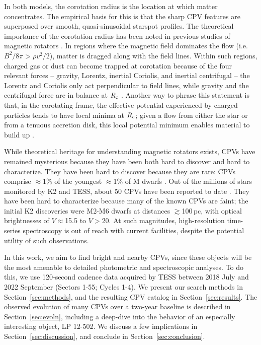 \documentclass[11pt,twocolumn,tighten]{aastex63}
\begin{document}
In both models, the corotation radius is the location at which matter
concentrates.  The empirical basis for this is that
the sharp CPV features are superposed over smooth, quasi-sinusoidal
starspot profiles.  The theoretical importance of the corotation
radius has been noted in previous studies of magnetic rotators
\citep[e.g.][]{1973ApJ...184..271L,1985Ap&SS.116..285N,1991ApJ...370L..39K,2005ApJ...634.1214L}.
%
%
In regions where the magnetic field dominates the flow (i.e.~$B^2/8\pi
> \rho v^2 /2$), matter is dragged along with the field lines.  
Within such regions, charged gas or dust can become trapped at corotation because
of the four relevant forces -- gravity, Lorentz, inertial
Coriolis, and inertial centrifugal -- the Lorentz and Coriolis only
act perpendicular to field lines, while gravity and the centrifugal
force are in balance at $R_{\rm c}$ \citep[e.g.][their
Section~2]{2005MNRAS.357..251T}.  Another way to phrase this statement
is that, in the corotating frame, the effective potential experienced
by charged particles tends to have local minima at $R_{\rm c}$; given
a flow from either the star or from a tenuous accretion disk, this
local potential minimum enables material to build up
\citep{2005MNRAS.357..251T}.

While theoretical heritage for understanding magnetic
rotators exists, CPVs have remained mysterious because they have been both
hard to discover and hard to characterize.   They have been hard to discover
because they are rare: CPVs comprise $\approx$1\% of the youngest
$\approx$1\% of M dwarfs \citep{2018AJ....155..196R}.  Out of the
millions of stars monitored by K2 and TESS, about 50 CPVs have been
reported to date
\citep{2016AJ....152..114R,2017AJ....153..152S,2018AJ....155...63S,2019ApJ...876..127Z,2020AJ....160...86B,2021AJ....161...60S,2022AJ....163..144G,2023ApJ...945..114P}.
They have been hard to characterize because many of the known CPVs are
faint; the initial K2 discoveries
\citep{2016AJ....152..114R,2017AJ....153..152S} were M2-M6 dwarfs at
distances $\gtrsim$100\,pc, with optical brightnesses of
$V$$\approx$15.5 to $V$$>$20.  At such magnitudes, high-resolution
time-series spectroscopy is out of reach with current facilities,
despite the potential utility of such observations.

In this work, we aim to find bright and nearby CPVs, since these
objects will be the most amenable to detailed photometric and
spectroscopic analyses.  To do this, we use 120-second cadence data
acquired by TESS between 2018 July and 2022 September (Sectors 1-55;
Cycles 1-4).  We present our search methods in
Section~\ref{sec:methods}, and the resulting CPV catalog in
Section~\ref{sec:results}.  The observed evolution of many CPVs over a
two-year baseline is described in Section~\ref{sec:evoln}, including a
deep-dive into the behavior of an especially interesting object, LP
12-502.  We discuss a few implications in
Section~\ref{sec:discussion}, and conclude in
Section~\ref{sec:conclusion}.
\end{document}
